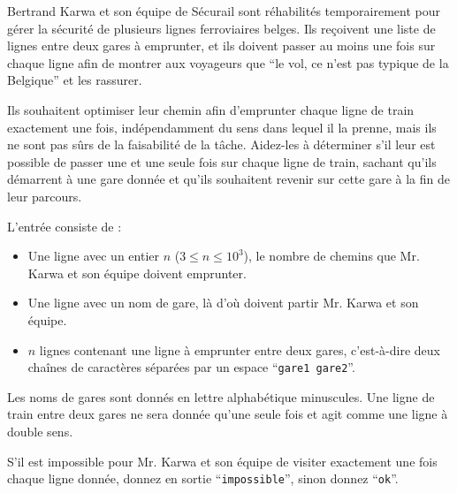 \problemname{\problemyamlname}

Bertrand Karwa et son équipe de Sécurail sont réhabilités temporairement pour gérer la sécurité de plusieurs
lignes ferroviaires belges. Ils reçoivent une liste de lignes entre deux gares à emprunter, et ils doivent passer au moins
une fois sur chaque ligne afin de montrer aux voyageurs que ``le vol, ce n'est pas typique de la Belgique'' et les rassurer.

Ils souhaitent optimiser leur chemin afin d'emprunter chaque ligne de train exactement une fois, indépendamment du sens dans lequel il la prenne, mais ils ne sont pas sûrs
de la faisabilité de la tâche. Aidez-les à déterminer s'il leur est possible de passer une et une seule fois sur chaque ligne de train, sachant qu'ils démarrent à une
gare donnée et qu'ils souhaitent revenir sur cette gare à la fin de leur parcours.

\begin{Input}
	L'entrée consiste de :
	\begin{itemize}
		\item Une ligne avec un entier $n$ ($3 \le n \le 10^3$), le nombre de chemins que Mr. Karwa et son équipe doivent emprunter.
		\item Une ligne avec un nom de gare, là d'où doivent partir Mr. Karwa et son équipe.
		\item $n$ lignes contenant une ligne à emprunter entre deux gares, c'est-à-dire deux chaînes de caractères séparées par un espace ``\verb|gare1 gare2|''.
	\end{itemize}
	Les noms de gares sont donnés en lettre alphabétique minuscules.
	Une ligne de train entre deux gares ne sera donnée qu'une seule fois et agit comme une ligne à double sens.
\end{Input}

\begin{Output}
	S'il est impossible pour Mr. Karwa et son équipe de visiter exactement une fois chaque ligne donnée, donnez en sortie ``\verb|impossible|'', sinon donnez ``\verb|ok|''.
\end{Output}
